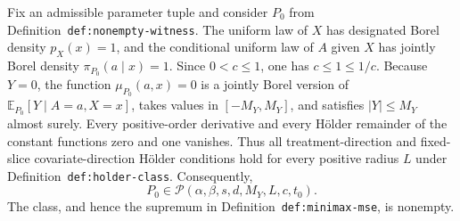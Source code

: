Fix an admissible parameter tuple and consider \(P_0\) from Definition~\texttt{def:nonempty-witness}. The uniform law of \(X\) has designated Borel density \(p_X(x)=1\), and the conditional uniform law of \(A\) given \(X\) has jointly Borel density \(\pi_{P_0}(a\mid x)=1\). Since \(0<c\le1\), one has \(c\le1\le1/c\). Because \(Y=0\), the function \(\mu_{P_0}(a,x)=0\) is a jointly Borel version of \(\mathbb E_{P_0}[Y\mid A=a,X=x]\), takes values in \([-M_Y,M_Y]\), and satisfies \(\lvert Y\rvert\le M_Y\) almost surely. Every positive-order derivative and every H\"older remainder of the constant functions zero and one vanishes. Thus all treatment-direction and fixed-slice covariate-direction H\"older conditions hold for every positive radius \(L\) under Definition~\texttt{def:holder-class}. Consequently,
\[
P_0\in\mathcal P(\alpha,\beta,s,d,M_Y,L,c,t_0).
\]
The class, and hence the supremum in Definition~\texttt{def:minimax-mse}, is nonempty.